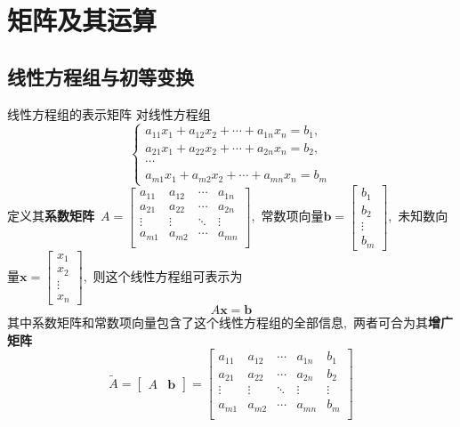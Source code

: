 \documentclass[10pt, a4paper, oneside, fontset=none]{ctexart}
\theoremstyle{plain}
\theoremstyle{definition}
\newcommand{\com}{,\,\,\,\:}
\newcommand{\de}[2][]{\begin{defil}{#1}\kai #2\end{defil}}
\begin{document}
\section{矩阵及其运算}
\subsection{线性方程组与初等变换}
\de[线性方程组的表示矩阵]{
    对线性方程组$$\begin{cases}
        a_{11}x_1+a_{12}x_2+\cdots+a_{1n}x_n=b_1\com \\
        a_{21}x_1+a_{22}x_2+\cdots+a_{2n}x_n=b_2\com \\
        \cdots\\
        a_{m1}x_1+a_{m2}x_2+\cdots+a_{mn}x_n=b_m
    \end{cases}$$
    定义其\textbf{\color{bali!75!black}系数矩阵}~$A=\begin{bmatrix}
        a_{11}&a_{12}&\cdots&a_{1n}\\
        a_{21}&a_{22}&\cdots&a_{2n}\\
        \vdots&\vdots&\ddots&\vdots\\
        a_{m1}&a_{m2}&\cdots&a_{mn}\\
    \end{bmatrix}$,~常数项向量$\boldsymbol{b}=\begin{bmatrix}
        b_1\\b_2\\\vdots\\b_m
    \end{bmatrix}$,~未知数向量$\boldsymbol{x}=\begin{bmatrix}
        x_1\\x_2\\\vdots\\x_n
    \end{bmatrix}$,~则这个线性方程组可表示为
    \begin{equation*}
        A\boldsymbol{x}=\boldsymbol{b}
    \end{equation*}
    其中系数矩阵和常数项向量包含了这个线性方程组的全部信息\com 两者可合为其\textbf{\color{bali!75!black}增广矩阵}$$\tilde{A}
    =\left[\begin{array}{c|c}
        A & \boldsymbol{b}
    \end{array}\right]=\left[\begin{array}{cccc|c}
        a_{11}&a_{12}&\cdots&a_{1n}&b_1\\
        a_{21}&a_{22}&\cdots&a_{2n}&b_2\\
        \vdots&\vdots&\ddots&\vdots&\vdots\\
        a_{m1}&a_{m2}&\cdots&a_{mn}&b_m\\
    \end{array}\right]$$
}
\end{document}
